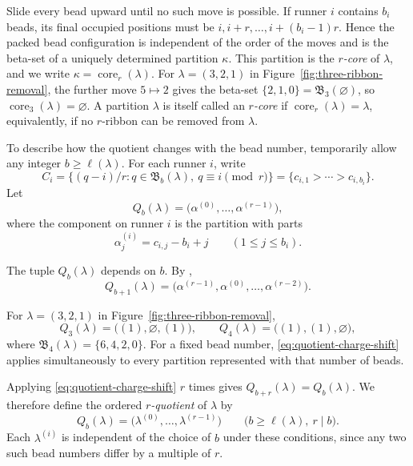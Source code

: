 \documentclass[12pt,reqno,a4paper]{amsart}
\numberwithin{equation}{section}
\numberwithin{figure}{section}
\theoremstyle{plain}
\theoremstyle{definition}
\newcommand{\emptypar}{\varnothing}
\begin{document}
Slide every bead upward until no such move is possible.  If runner
$i$ contains $b_i$ beads, its final occupied positions must be
$i,i+r,\ldots,i+(b_i-1)r$.  Hence the packed bead configuration is
independent of the order of the moves and is the beta-set of a uniquely determined
partition $\kappa$.  This partition is the \emph{$r$-core} of
$\lambda$, and we write $\kappa=\operatorname{core}_r(\lambda)$. For $\lambda=(3,2,1)$ in Figure~\ref{fig:three-ribbon-removal},
the further move $5\mapsto2$ gives the beta-set
$\{2,1,0\}=\mathfrak B_3(\varnothing)$, so
$\operatorname{core}_3(\lambda)=\varnothing$. A
partition $\lambda$ is itself called an \emph{$r$-core} if
$\operatorname{core}_r(\lambda)=\lambda$, equivalently, if no $r$-ribbon can be removed from $\lambda$.



To describe how the quotient changes with the bead number, temporarily
allow any integer $b\geq\ell(\lambda)$.  For each runner $i$, write
\[
C_i=\{(q-i)/r:q\in \mathfrak B_b(\lambda),\ q\equiv i\pmod r\}
=\{c_{i,1}>\cdots>c_{i,b_i}\}.
\]
Let
\[
Q_b(\lambda)
=\bigl(\alpha^{(0)},\ldots,\alpha^{(r-1)}\bigr),
\]
where the component on runner $i$ is the partition with parts
\[
\alpha^{(i)}_j=c_{i,j}-b_i+j
\qquad(1\leq j\leq b_i).
\]

The tuple $Q_b(\lambda)$ depends on $b$.  By
\cite[Section~1.1.1, p.~442]{Fayers},
\begin{equation}\label{eq:quotient-charge-shift}
Q_{b+1}(\lambda)
=\bigl(\alpha^{(r-1)},\alpha^{(0)},\ldots,
       \alpha^{(r-2)}\bigr).
\end{equation}

For $\lambda=(3,2,1)$ in Figure~\ref{fig:three-ribbon-removal},
\[
 Q_3(\lambda)=\bigl((1),\emptypar,(1)\bigr),
 \qquad
 Q_4(\lambda)=\bigl((1),(1),\emptypar\bigr),
\]
where $\mathfrak B_4(\lambda)=\{6,4,2,0\}$.
For a fixed bead number, \eqref{eq:quotient-charge-shift} applies
simultaneously to every partition represented with that number of beads.

Applying \eqref{eq:quotient-charge-shift} $r$ times gives
$Q_{b+r}(\lambda)=Q_b(\lambda)$.  We therefore define the ordered
\emph{$r$-quotient} of $\lambda$ by
\begin{equation}\label{eq:standard-quotient-tuple}
Q_b(\lambda)
=\bigl(\lambda^{(0)},\ldots,\lambda^{(r-1)}\bigr)
\qquad\bigl(b\geq\ell(\lambda),\ r\mid b\bigr).
\end{equation}
Each $\lambda^{(i)}$ is independent of the choice of $b$ under
these conditions, since any two such bead numbers differ by a multiple of $r$.
\end{document}
